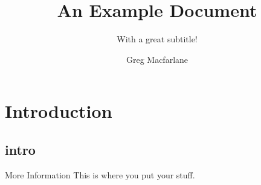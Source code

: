 \documentclass[darktitle, framenumber]{beamer}
\title{An Example Document}
\subtitle{With a great subtitle!}
\author{Greg Macfarlane}
\begin{document}
\begin{frame}{}
	\titlepage
\end{frame}

\section{Introduction}
\subsection{intro}
\begin{frame}{More Information}
This is where you put your stuff.
\end{frame}
\end{document}
